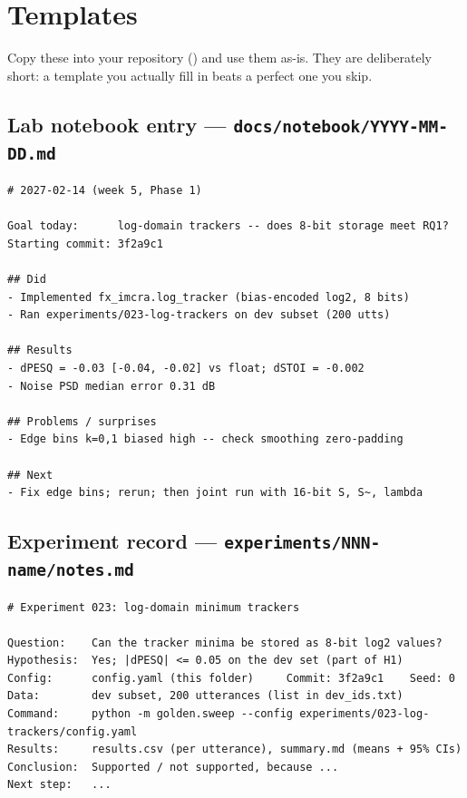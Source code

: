 \chapter{Templates}\label{app:templates}

Copy these into your repository () and use them as-is.
They are deliberately short: a template you actually fill in beats a perfect one
you skip.

\section*{Lab notebook entry --- \texttt{docs/notebook/YYYY-MM-DD.md}}
\begin{lstlisting}[style=plain]
# 2027-02-14 (week 5, Phase 1)

Goal today:      log-domain trackers -- does 8-bit storage meet RQ1?
Starting commit: 3f2a9c1

## Did
- Implemented fx_imcra.log_tracker (bias-encoded log2, 8 bits)
- Ran experiments/023-log-trackers on dev subset (200 utts)

## Results
- dPESQ = -0.03 [-0.04, -0.02] vs float; dSTOI = -0.002
- Noise PSD median error 0.31 dB

## Problems / surprises
- Edge bins k=0,1 biased high -- check smoothing zero-padding

## Next
- Fix edge bins; rerun; then joint run with 16-bit S, S~, lambda
\end{lstlisting}

\section*{Experiment record --- \texttt{experiments/NNN-name/notes.md}}
\begin{lstlisting}[style=plain]
# Experiment 023: log-domain minimum trackers

Question:    Can the tracker minima be stored as 8-bit log2 values?
Hypothesis:  Yes; |dPESQ| <= 0.05 on the dev set (part of H1)
Config:      config.yaml (this folder)     Commit: 3f2a9c1    Seed: 0
Data:        dev subset, 200 utterances (list in dev_ids.txt)
Command:     python -m golden.sweep --config experiments/023-log-trackers/config.yaml
Results:     results.csv (per utterance), summary.md (means + 95% CIs)
Conclusion:  Supported / not supported, because ...
Next step:   ...
\end{lstlisting}

